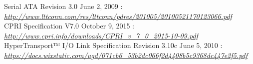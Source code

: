 \newline
Serial ATA Revision 3.0 June 2, 2009 : \\
\href{http://www.lttconn.com/res/lttconn/pdres/201005/20100521170123066.pdf}{\textit{http://www.lttconn.com/res/lttconn/pdres/201005/20100521170123066.pdf}}\\
\newline
CPRI Specification V7.0 October 9, 2015 :\\
\href{http://www.cpri.info/downloads/CPRI_v_7_0_2015-10-09.pdf}{\textit{http://www.cpri.info/downloads/CPRI\_v\_7\_0\_2015-10-09.pdf}}\\
\newline
HyperTransport™ I/O Link Specification Revision 3.10c June 5, 2010 : \\
\href{https://docs.wixstatic.com/ugd/071cb6_53b2dc066f2d4408b5c9368dc447e2f5.pdf}{\textit{https://docs.wixstatic.com/ugd/071cb6\_53b2dc066f2d4408b5c9368dc447e2f5.pdf}}\\ \newline

\newpage